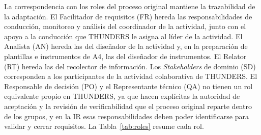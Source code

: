 \documentclass[12pt,letterpaper,oneside]{report}
\begin{document}
La correspondencia con los roles del proceso original mantiene la trazabilidad
de la adaptación. El Facilitador de requisitos (FR) hereda las
responsabilidades de conducción, monitoreo y análisis del coordinador de la
actividad, junto con el apoyo a la conducción que THUNDERS le asigna al líder de
la actividad. El Analista (AN) hereda las del diseñador de la actividad y, en la
preparación de plantillas e instrumentos de A4, las del diseñador de
instrumentos. El Relator (RT) hereda las del recolector de información. Los
\textit{Stakeholders} de dominio (SD) corresponden a los participantes de la actividad
colaborativa de THUNDERS. El Responsable de decisión (PO) y el Representante
técnico (QA) no tienen un rol equivalente propio en THUNDERS, ya que hacen
explícitas la autoridad de aceptación y la revisión de verificabilidad que el
proceso original reparte dentro de los grupos, y en la IR esas
responsabilidades deben poder identificarse para validar y cerrar requisitos.
La Tabla~\ref{tab:roles} resume cada rol.
\end{document}
